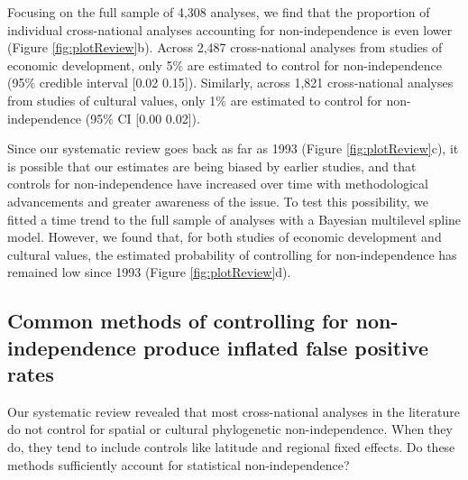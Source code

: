 \documentclass[english,man,floatsintext]{apa6}
\begin{document}
Focusing on the full sample of 4,308 analyses, we find that the proportion of individual cross-national analyses accounting for non-independence is even lower (Figure \ref{fig:plotReview}b). Across 2,487 cross-national analyses from studies of economic development, only 5\% are estimated to control for non-independence (95\% credible interval {[}0.02 0.15{]}). Similarly, across 1,821 cross-national analyses from studies of cultural values, only 1\% are estimated to control for non-independence (95\% CI {[}0.00 0.02{]}).

Since our systematic review goes back as far as 1993 (Figure \ref{fig:plotReview}c), it is possible that our estimates are being biased by earlier studies, and that controls for non-independence have increased over time with methodological advancements and greater awareness of the issue. To test this possibility, we fitted a time trend to the full sample of analyses with a Bayesian multilevel spline model. However, we found that, for both studies of economic development and cultural values, the estimated probability of controlling for non-independence has remained low since 1993 (Figure \ref{fig:plotReview}d).

\hypertarget{common-methods-of-controlling-for-non-independence-produce-inflated-false-positive-rates}{%
\subsection{Common methods of controlling for non-independence produce inflated false positive rates}\label{common-methods-of-controlling-for-non-independence-produce-inflated-false-positive-rates}}

Our systematic review revealed that most cross-national analyses in the literature do not control for spatial or cultural phylogenetic non-independence. When they do, they tend to include controls like latitude and regional fixed effects. Do these methods sufficiently account for statistical non-independence?
\end{document}
